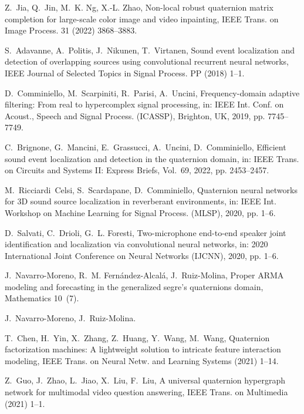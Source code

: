 \documentclass[3p, preprint, twocolumn]{elsarticle}
\begin{document}
\begin{thebibliography}{10}
Z.~Jia, Q.~Jin, M.~K. Ng, X.-L. Zhao, Non-local robust quaternion matrix
  completion for large-scale color image and video inpainting, IEEE Trans. on
  Image Process. 31 (2022) 3868--3883.

S.~Adavanne, A.~Politis, J.~Nikunen, T.~Virtanen, Sound event localization and
  detection of overlapping sources using convolutional recurrent neural
  networks, IEEE Journal of Selected Topics in Signal Process. PP (2018) 1--1.

D.~Comminiello, M.~Scarpiniti, R.~Parisi, A.~Uncini, Frequency-domain adaptive
  filtering: From real to hypercomplex signal processing, in: IEEE Int. Conf.
  on Acoust., Speech and Signal Process. (ICASSP), Brighton, UK, 2019, pp.
  7745--7749.

C.~Brignone, G.~Mancini, E.~Grassucci, A.~Uncini, D.~Comminiello, Efficient
  sound event localization and detection in the quaternion domain, in: IEEE
  Trans. on Circuits and Systems II: Express Briefs, Vol.~69, 2022, pp.
  2453--2457.

M.~Ricciardi~Celsi, S.~Scardapane, D.~Comminiello, Quaternion neural networks
  for 3{D} sound source localization in reverberant environments, in: IEEE Int.
  Workshop on Machine Learning for Signal Process. (MLSP), 2020, pp. 1--6.

D.~Salvati, C.~Drioli, G.~L. Foresti, Two-microphone end-to-end speaker joint
  identification and localization via convolutional neural networks, in: 2020
  International Joint Conference on Neural Networks (IJCNN), 2020, pp. 1--6.

J.~Navarro-Moreno, R.~M. Fernández-Alcalá, J.~Ruiz-Molina, Proper {ARMA}
  modeling and forecasting in the generalized segre's quaternions domain,
  Mathematics 10~(7).

J.~Navarro-Moreno, J.~Ruiz-Molina.

T.~Chen, H.~Yin, X.~Zhang, Z.~Huang, Y.~Wang, M.~Wang, Quaternion factorization
  machines: A lightweight solution to intricate feature interaction modeling,
  IEEE Trans. on Neural Netw. and Learning Systems (2021) 1--14.

Z.~Guo, J.~Zhao, L.~Jiao, X.~Liu, F.~Liu, A universal quaternion hypergraph
  network for multimodal video question answering, IEEE Trans. on Multimedia
  (2021) 1--1.


\end{thebibliography}
\end{document}
